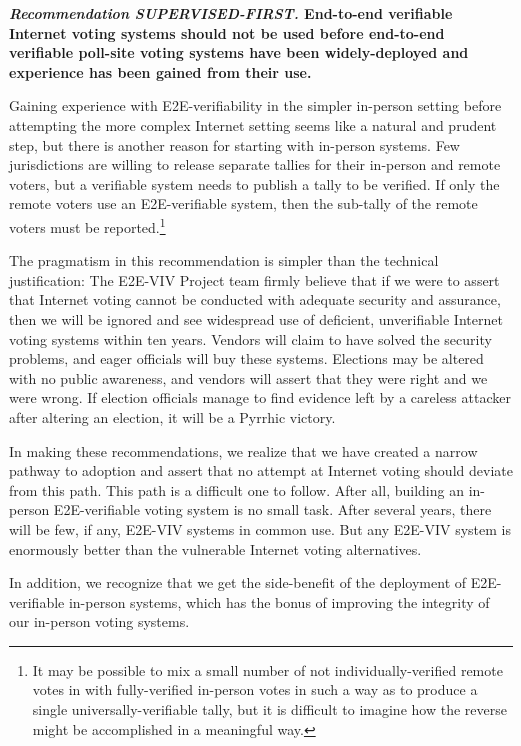 \begin{center}
  \textbf{\emph{Recommendation SUPERVISED-FIRST.} End-to-end
    verifiable Internet voting systems should not be used before
    end-to-end verifiable poll-site voting systems have been
    widely-deployed and experience has been gained from their use.}
\end{center}

Gaining experience with E2E-verifiability in the simpler in-person
setting before attempting the more complex Internet setting seems like
a natural and prudent step, but there is another reason for starting
with in-person systems.  Few jurisdictions are willing to release
separate tallies for their in-person and remote voters, but a
verifiable system needs to publish a tally to be verified.  If only
the remote voters use an E2E-verifiable system, then the sub-tally of
the remote voters must be reported.\footnote{It may be possible to mix
  a small number of not individually-verified remote votes in with
  fully-verified in-person votes in such a way as to produce a single
  universally-verifiable tally, but it is difficult to imagine how the
  reverse might be accomplished in a meaningful way.}
 
The pragmatism in this recommendation is simpler than the technical
justification: The E2E-VIV Project team firmly believe that if we
were to assert that Internet voting cannot be conducted with adequate
security and assurance, then we will be ignored and see widespread use
of deficient, unverifiable Internet voting systems within ten years.
Vendors will claim to have solved the security problems, and eager
officials will buy these systems.  Elections may be altered with no
public awareness, and vendors will assert that they were right and we
were wrong.  If election officials manage to find
evidence left by a careless attacker after altering an election, it
will be a Pyrrhic victory.
 
In making these recommendations, we realize that we have created a
narrow pathway to adoption and assert that no attempt at Internet
voting should deviate from this path.  This path is a difficult one to
follow.  After all, building an in-person E2E-verifiable voting system
is no small task.  After several years, there will be few, if any,
E2E-VIV systems in common use.  But any E2E-VIV system is enormously
better than the vulnerable Internet voting alternatives.  

In addition, we recognize that we get the side-benefit of the
deployment of E2E-verifiable in-person systems, which has the bonus of
improving the integrity of our in-person voting systems.

